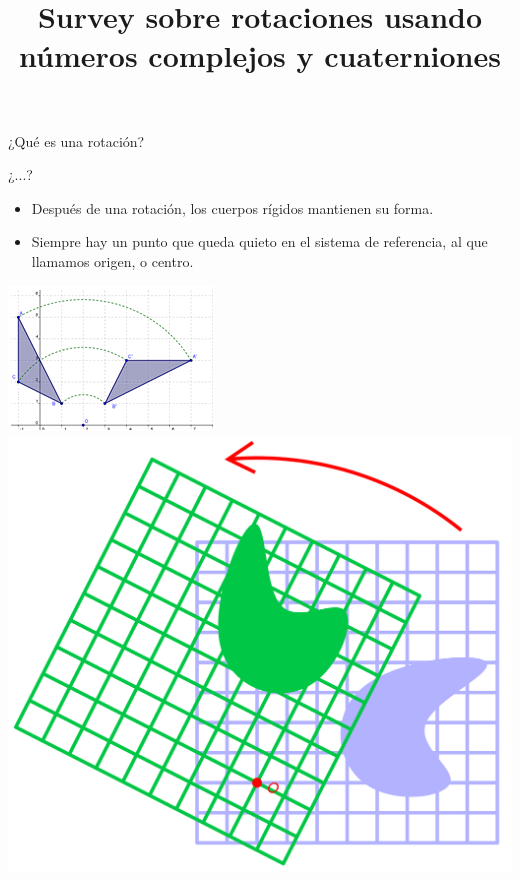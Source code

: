 \documentclass[10pt]{beamer}
\title{Survey sobre rotaciones usando números complejos y cuaterniones}
\begin{document}
\maketitle


\begin{frame}{¿Qué es una rotación?}


¿...?




\begin{itemize}
	\item Después de una rotación, los cuerpos rígidos mantienen su forma. %
	\item Siempre hay un punto que queda quieto en el sistema de referencia, al que llamamos origen, o centro.
\end{itemize}



\includegraphics[scale=0.8]{rigid.png}
\includegraphics[scale=0.11]{fixed.png}

\end{frame}
\end{document}
